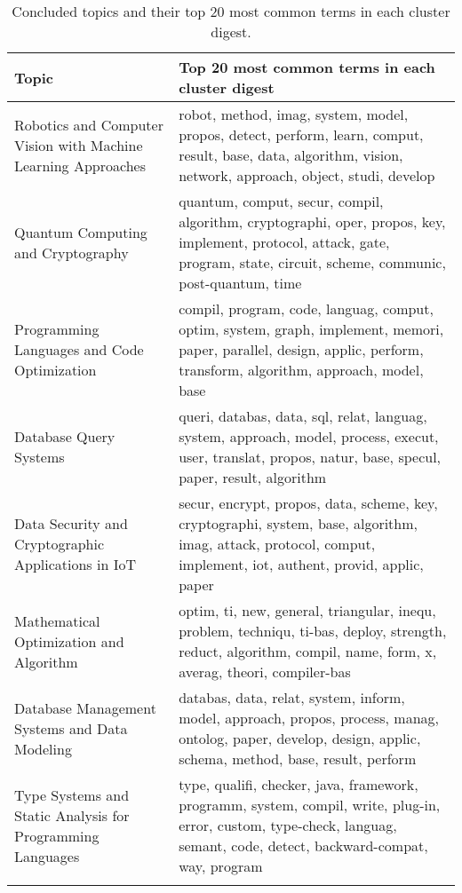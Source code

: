 \begin{longtable}{|p{3cm}|p{7cm}|}
    \hline
    \textbf{Topic}                                                & \textbf{Top 20 most common terms in each cluster digest             }                                                                                                        \\
    \hline
    Robotics and Computer Vision with Machine Learning Approaches & robot, method, imag, system, model, propos, detect, perform, learn, comput, result, base, data, algorithm, vision, network, approach, object, studi, develop                 \\
    \hline
    Quantum Computing and Cryptography                            & quantum, comput, secur, compil, algorithm, cryptographi, oper, propos, key, implement, protocol, attack, gate, program, state, circuit, scheme, communic, post-quantum, time \\
    \hline
    Programming Languages and Code Optimization                   & compil, program, code, languag, comput, optim, system, graph, implement, memori, paper, parallel, design, applic, perform, transform, algorithm, approach, model, base       \\
    \hline
    Database Query Systems                                        & queri, databas, data, sql, relat, languag, system, approach, model, process, execut, user, translat, propos, natur, base, specul, paper, result, algorithm                   \\
    \hline
    Data Security and Cryptographic Applications in IoT           & secur, encrypt, propos, data, scheme, key, cryptographi, system, base, algorithm, imag, attack, protocol, comput, implement, iot, authent, provid, applic, paper             \\
    \hline
    Mathematical Optimization and Algorithm                       & optim, ti, new, general, triangular, inequ, problem, techniqu, ti-bas, deploy, strength, reduct, algorithm, compil, name, form, x, averag, theori, compiler-bas              \\
    \hline
    Database Management Systems and Data Modeling                 & databas, data, relat, system, inform, model, approach, propos, process, manag, ontolog, paper, develop, design, applic, schema, method, base, result, perform                \\
    \hline
    Type Systems and Static Analysis for Programming Languages    & type, qualifi, checker, java, framework, programm, system, compil, write, plug-in, error, custom, type-check, languag, semant, code, detect, backward-compat, way, program   \\
    \hline
    \caption{Concluded topics and their top 20 most common terms in each cluster digest.}
    \label{tab:concluded_topics}
\end{longtable}
